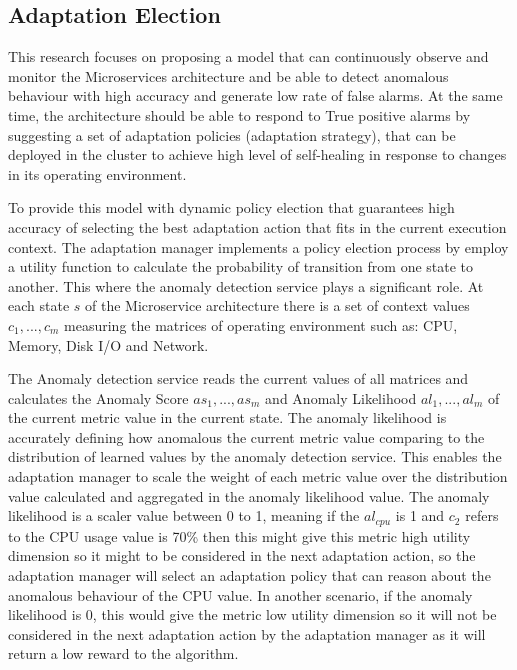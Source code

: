 \documentclass[graybox]{svmult}
\begin{document}
\subsection{Adaptation Election}
\label{sec:mapk}

This research focuses on proposing a model that can continuously observe and monitor the Microservices architecture and be able to detect anomalous behaviour with high accuracy and generate low rate of false alarms. At the same time, the architecture should be able to respond to True positive alarms by suggesting a set of adaptation policies (adaptation strategy), that can be deployed in the cluster to achieve high level of self-healing in response to changes in its operating environment.  

To provide this model with dynamic policy election that guarantees high accuracy of selecting the best adaptation action that fits in the current execution context. The adaptation manager implements a policy election process by employ a utility function to calculate the probability of transition from one state to another. This where the anomaly detection service plays a significant role. At each state $s$ of the Microservice architecture there is a set of context values $c_{1},...,c_{m}$ measuring the matrices of operating environment such as: CPU, Memory, Disk I/O and Network. 

The Anomaly detection service reads the current values of all matrices and calculates the Anomaly Score $as_{1},..., as_{m}$ and Anomaly Likelihood $al_{1},...,al_{m}$ of the current metric value in the current state. The anomaly likelihood is accurately defining how anomalous the current metric value comparing to the distribution of learned values by the anomaly detection service. This enables the adaptation manager to scale the weight of each metric value over the distribution value calculated and aggregated in the anomaly likelihood value. The anomaly likelihood is a scaler value between 0 to 1, meaning if the $al_{cpu}$ is 1 and $c_{2}$ refers to the CPU usage value is 70\% then this might give this metric high utility dimension so it might to be considered in the next adaptation action, so the adaptation manager will select an adaptation policy that can reason about the anomalous behaviour of the CPU value. In another scenario, if the anomaly likelihood is 0, this would give the metric low utility dimension so it will not be considered in the next adaptation action by the adaptation manager as it will return a low reward to the algorithm. 
 
\end{document}
